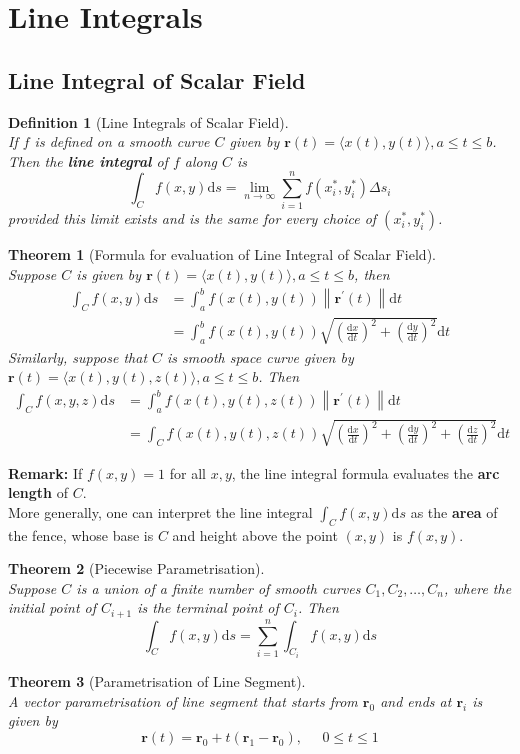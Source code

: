 \documentclass[12pt]{article}
\newcommand\norm[1]{\left\lVert#1\right\rVert}
\newtheorem{definition}{Definition}[section]
\newtheorem{theorem}{Theorem}[section]
\theoremstyle{definition}
\newcommand{\diff}{\mathrm{d}}
\begin{document}
\section{Line Integrals}
\subsection{Line Integral of Scalar Field}
\begin{definition}[Line Integrals of Scalar Field]\hfill\\\normalfont If $f$ is defined on a smooth curve $C$ given by $\mathbf{r}(t) = \langle x(t),y(t)\rangle , a\leq t\leq b$. Then the \textbf{line integral} of $f$ along $C$ is
\[
\int_Cf(x,y)\diff s = \lim_{n\to\infty}\sum_{i=1}^n f(x_i^\ast, y_i^\ast)\Delta s_i
\]
provided this limit exists and is the same for every choice of $(x_i^\ast, y_i^\ast)$.
\end{definition}
\begin{theorem}[Formula for evaluation of Line Integral of Scalar Field]
\hfill\\\normalfont Suppose $C$ is given by $\mathbf{r}(t) = \langle x(t),y(t)\rangle, a\leq t\leq b$, then
\begin{align*}
\int_Cf(x,y)\diff s &= \int_a^bf(x(t),y(t))\norm{\mathbf{r}^\prime(t)}\diff t\\
&=\int_a^bf(x(t),y(t))\sqrt{\left(\frac{\diff x}{\diff t}\right)^2+\left(\frac{\diff y}{\diff t}\right)^2}\diff t
\end{align*}
Similarly, suppose that $C$ is smooth space curve given by $\mathbf{r}(t)=\langle x(t),y(t),z(t)\rangle, a\leq t\leq b$. Then
\begin{align*}
\int_C f(x,y,z)\diff s &=\int_a^b f(x(t),y(t),z(t))\norm{\mathbf{r}^\prime(t)}\diff t\\
&=\int_C f(x(t),y(t),z(t))\sqrt{\left(\frac{\diff x}{\diff t}\right)^2+\left(\frac{\diff y}{\diff t}\right)^2+\left(\frac{\diff z}{\diff t}\right)^2}\diff t
\end{align*}
\end{theorem}
\textbf{Remark:} If $f(x,y)=1$ for all $x,y$, the line integral formula evaluates the \textbf{arc length} of $C$.\\
More generally, one can interpret the line integral $\int_Cf(x,y)\diff s$ as the \textbf{area} of the fence, whose base is $C$ and height above the point $(x,y)$ is $f(x,y)$.
\begin{theorem}[Piecewise Parametrisation]
\hfill\\\normalfont Suppose $C$ is a union of a finite number of smooth curves $C_1, C_2,\ldots, C_n$, where the initial point of $C_{i+1}$ is the terminal point of $C_i$. Then
\[
\int_Cf(x,y)\diff s = \sum_{i=1}^n \int_{C_i}f(x,y)\diff s
\]
\end{theorem}
\begin{theorem}[Parametrisation of Line Segment]
\hfill\\\normalfont A vector parametrisation of line segment that starts from $\mathbf{r}_0$ and ends at $\mathbf{r}_i$ is given by
\[
\mathbf{r}(t) = \mathbf{r}_0+t(\mathbf{r}_1-\mathbf{r}_0),\;\;\;\;\;0\leq t\leq 1
\]
\end{theorem}
\end{document}
